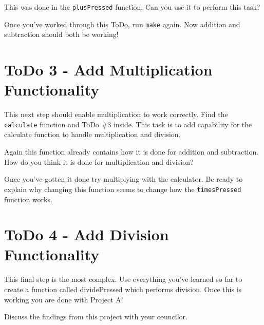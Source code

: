     This was done in the \texttt{plusPressed} function.
    Can you use it to perform this task?

    Once you've worked through this ToDo, run \texttt{make} again.
    Now addition and subtraction should both be working!

  \section{ToDo 3 - Add Multiplication Functionality}
  \label{sec:project_a_todo_3}

    This next step should enable multiplication to work correctly.
    Find the \texttt{calculate} function and ToDo \#3 inside.
    This task is to add capability for the calculate function to handle multiplication and division.

    Again this function already contains how it is done for addition and subtraction.
    How do you think it is done for multiplication and division?

    Once you've gotten it done try multiplying with the calculator.
    Be ready to explain why changing this function seems to change how the \texttt{timesPressed} function works.

  \section{ToDo 4 - Add Division Functionality}
  \label{sec:project_a_todo_4}

    This final step is the most complex.
    Use everything you've learned so far to create a function called dividePressed which performs division.
    Once this is working you are done with Project A!

    Discuss the findings from this project with your councilor.